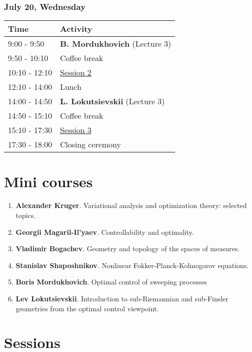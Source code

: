 \documentclass[
]{article}
\providecommand{\tightlist}{%
  \setlength{\itemsep}{0pt}\setlength{\parskip}{0pt}}
\begin{document}
\hypertarget{july-20-wednesday}{%
\subsubsection{July 20, Wednesday}\label{july-20-wednesday}}

\begin{longtable}[]{@{}ll@{}}
\toprule()
Time & Activity \\
\midrule()
\endhead
9:00 - 9:50 & \textbf{B. Mordukhovich} (Lecture 3) \\
9:50 - 10:10 & Coffee break \\
10:10 - 12:10 & \protect\hyperlink{se}{Session 2} \\
12:10 - 14:00 & Lunch \\
14:00 - 14:50 & \textbf{L. Lokutsievskii} (Lecture 3) \\
14:50 - 15:10 & Coffee break \\
15:10 - 17:30 & \protect\hyperlink{se}{Session 3} \\
17:30 - 18:00 & Closing ceremony \\
\bottomrule()
\end{longtable}

\hypertarget{mini-courses}{%
\section{Mini courses}\label{mini-courses}}

\begin{enumerate}
\def\labelenumi{\arabic{enumi}.}
\tightlist
\item
  \textbf{Alexander Kruger}. Variational analysis and optimization
  theory: selected topics.
\item
  \textbf{Georgii Magaril-Il'yaev}. Controllability and optimality.
\item
  \textbf{Vladimir Bogachev}. Geometry and topology of the spaces of
  measures.
\item
  \textbf{Stanislav Shaposhnikov}. Nonlinear Fokker-Planck-Kolmogorov
  equations.
\item
  \textbf{Boris Mordukhovich}. Optimal control of sweeping processes
\item
  \textbf{Lev Lokutsievskii}. Introduction to sub-Riemannian and
  sub-Finsler geometries from the optimal control viewpoint. \newpage
\end{enumerate}

\hypertarget{se}{%
\section{Sessions}\label{se}}
\end{document}
